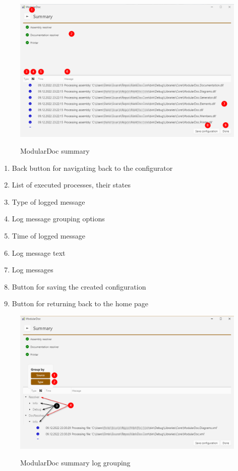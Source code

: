 \begin{figure}[H]
    \includegraphics[width=\linewidth]{img/modularDocSummary.png}
    \label{fig:modularDocSummaryPage}
    \caption{ModularDoc summary}
\end{figure}

\begin{enumerate}
    \item Back button for navigating back to the configurator
    \item List of executed processes, their states
    \item Type of logged message
    \item Log message grouping options
    \item Time of logged message
    \item Log message text
    \item Log messages
    \item Button for saving the created configuration
    \item Button for returning back to the home page
\end{enumerate}

\begin{figure}[H]
    \includegraphics[width=\linewidth]{img/modularDocSummaryLogGroupping.png}
    \label{fig:modularDocSummaryGroupingPage}
    \caption{ModularDoc summary log grouping}
\end{figure}

